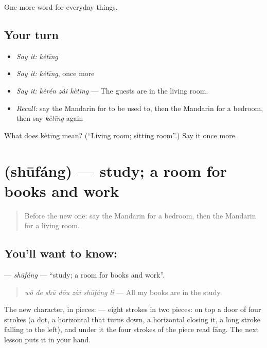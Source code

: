 \begin{grammarlens}[title={What you've built}]
One more word for everyday things.
\end{grammarlens}

\subsection*{Your turn}
\begin{itemize}
\raggedright
  \item \emph{Say it:} \emph{kètīng}
  \item \emph{Say it:} \emph{kètīng}, once more
  \item \emph{Say it:} \emph{kèrén zài kètīng} — The guests are in the living room.
  \item \emph{Recall:} say the Mandarin for to be used to, then the Mandarin for a bedroom, then say \emph{kètīng} again
\end{itemize}

\begin{tcolorbox}[breakable,colback=teal!4,colframe=teal!35!black,title={Before you move on}]
What does kètīng mean? (\textquotedblleft{}Living room; sitting room\textquotedblright{}.) Say it once more.
\end{tcolorbox}
\section[\texorpdfstring{\zh{书房} (shūfáng)}{书房 (shūfáng)}]{ (shūfáng) — study; a room for books and work}

\label{lesson:ZH-C159-shufang}



\begin{quote}
Before the new one: say the Mandarin for a bedroom, then the Mandarin for a living room.
\end{quote}

\subsection*{You'll want to know: }
\textbf{} — \emph{shūfáng} — \textquotedblleft{}study; a room for books and work\textquotedblright{}.

\begin{quote}
\textbf{} \emph{wǒ de shū dōu zài shūfáng lǐ} — All my books are in the study.
\end{quote}

The new character, in pieces:  — eight strokes in two pieces: on top a door of four strokes (a dot, a horizontal that turns down, a horizontal closing it, a long stroke falling to the left), and under it the four strokes of the piece read fāng. The next lesson puts it in your hand.

